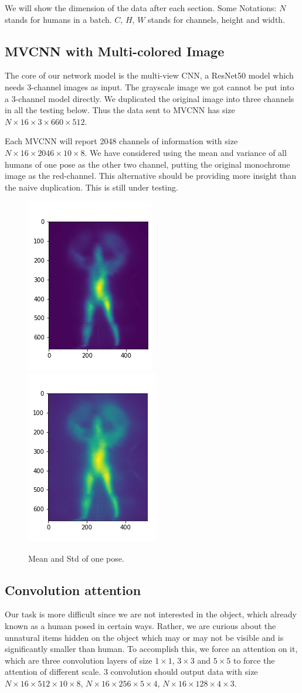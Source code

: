 \documentclass[conference,compsoc]{IEEEtran}
\begin{document}
We will show the dimension of the data after each section. Some Notations: $N$ stands for humans in a batch. $C$, $H$, $W$ stands for channels, height and width.

\subsection{MVCNN with Multi-colored Image}
The core of our network model is the multi-view CNN, a ResNet50 model which needs 3-channel images as input.
The grayscale image we got cannot be put into a 3-channel model directly. We duplicated the original image into three channels in all the testing below.
Thus the data sent to MVCNN has size $N\times16\times 3\times 660 \times 512$.

Each MVCNN will report 2048 channels of information with size $N \times 16 \times 2046 \times 10 \times 8$.
We have considered using the mean and variance of all humans of one pose as the other two channel, putting the original monochrome image as the red-channel. This alternative should be providing more insight than the naive duplication. This is still under testing.
\begin{figure}[!tp]
	\centering
	\includegraphics[width=.2\textwidth]{../Pic/mean_perspective_1}
	\includegraphics[width=.2\textwidth]{../Pic/std_perspective_1}
	\caption{Mean and Std of one pose.}
\end{figure}

\subsection{Convolution attention}
Our task is more difficult since we are not interested in the object, which already known as a human posed in certain ways. Rather, we are curious about the unnatural items hidden on the object which may or may not be visible and is significantly smaller than human. To accomplish this, we force an attention on it, which are three convolution layers of size $1\times1$, $3\times3$ and $5\times5$ to force the attention of different scale. 3 convolution should output data with size $N\times16\times512\times 10\times8$, $N\times16\times256\times5\times4$, $N\times16\times128\times4\times3$.
\end{document}
